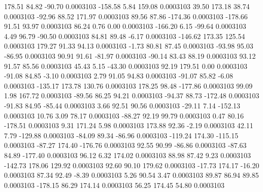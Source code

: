       178.51       84.82      -90.70     0.0003103
     -158.58        5.84      159.08     0.0003103
       39.50      173.18       38.74     0.0003103
      -92.96       88.52      171.97     0.0003103
       89.56       87.86     -174.36     0.0003103
     -178.66       91.51       93.97     0.0003103
       86.24        0.76        0.00     0.0003103
     -166.20        6.15      -99.64     0.0003103
        4.49       96.79      -90.50     0.0003103
       84.81       89.48       -6.17     0.0003103
     -146.62      173.35      125.54     0.0003103
      179.27       91.33       94.13     0.0003103
       -1.73       80.81       87.45     0.0003103
      -93.98       95.03      -86.95     0.0003103
       90.91       91.61      -81.97     0.0003103
      -90.14       83.43       88.19     0.0003103
       93.12       91.57       85.56     0.0003103
       45.43        5.15      -43.30     0.0003103
       92.19      179.51        0.00     0.0003103
      -91.08       84.85       -3.10     0.0003103
        2.79       91.05       94.83     0.0003103
      -91.07       85.82       -6.08     0.0003103
     -135.17      173.78      130.76     0.0003103
      178.25       98.48     -177.86     0.0003103
       99.09        1.98      167.72     0.0003103
      -89.56       86.25       94.21     0.0003103
      -94.37       88.73     -172.48     0.0003103
      -91.83       84.95      -85.44     0.0003103
        3.66       92.51       90.56     0.0003103
      -29.11        7.14     -152.13     0.0003103
       10.76        3.09       78.17     0.0003103
      -88.27       92.19       99.79     0.0003103
        0.47       80.16     -178.51     0.0003103
        9.31      171.24        5.98     0.0003103
      173.88       92.36       -2.19     0.0003103
       42.11        7.79     -129.88     0.0003103
      -84.09       89.34      -86.96     0.0003103
     -119.24      174.30     -115.15     0.0003103
      -87.27      174.40     -176.76     0.0003103
       92.55       90.99      -86.86     0.0003103
      -87.63       84.89     -177.40     0.0003103
       96.12        6.32      174.02     0.0003103
       88.98       87.42        9.23     0.0003103
     -142.73      178.06      129.92     0.0003103
       92.60       90.10      179.62     0.0003103
      -17.73      174.17      -16.20     0.0003103
       87.34       92.49       -8.39     0.0003103
        5.26       90.54        3.47     0.0003103
       89.87       86.94       89.85     0.0003103
     -178.15       86.29      174.14     0.0003103
       56.25      174.45       54.80     0.0003103
